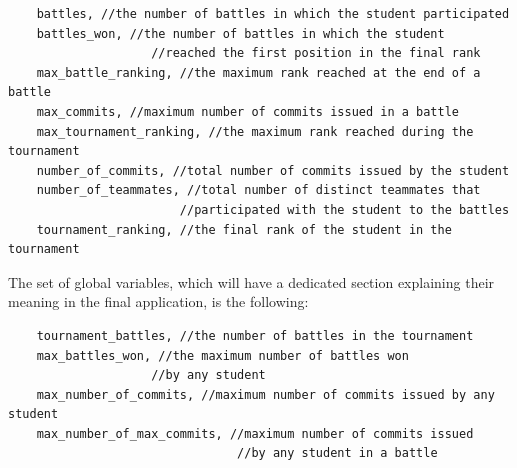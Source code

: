 \begin{verbatim}
    battles, //the number of battles in which the student participated
    battles_won, //the number of battles in which the student
                    //reached the first position in the final rank
    max_battle_ranking, //the maximum rank reached at the end of a battle
    max_commits, //maximum number of commits issued in a battle
    max_tournament_ranking, //the maximum rank reached during the tournament
    number_of_commits, //total number of commits issued by the student
    number_of_teammates, //total number of distinct teammates that
                        //participated with the student to the battles
    tournament_ranking, //the final rank of the student in the tournament
\end{verbatim}

The set of global variables, which will have a dedicated section explaining their meaning in the final application, is the following:

\begin{verbatim}
    tournament_battles, //the number of battles in the tournament
    max_battles_won, //the maximum number of battles won
                    //by any student
    max_number_of_commits, //maximum number of commits issued by any student
    max_number_of_max_commits, //maximum number of commits issued
                                //by any student in a battle
\end{verbatim}

